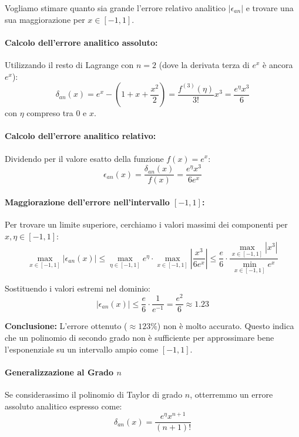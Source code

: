 \documentclass[a4paper,12pt]{article}
\begin{document}
	Vogliamo stimare quanto sia grande l'errore relativo analitico $|\epsilon_{an}|$ e trovare una sua maggiorazione per $x \in [-1, 1]$.
	
	\paragraph{Calcolo dell'errore analitico assoluto:}
	Utilizzando il resto di Lagrange con $n=2$ (dove la derivata terza di $e^x$ è ancora $e^x$):
	\[ \delta_{an}(x) = e^x - \left( 1 + x + \frac{x^2}{2} \right) = \frac{f^{(3)}(\eta)}{3!} x^3 = \frac{e^\eta x^3}{6} \]
	con $\eta$ compreso tra $0$ e $x$.
	
	\paragraph{Calcolo dell'errore analitico relativo:}
	Dividendo per il valore esatto della funzione $f(x) = e^x$:
	\[ \epsilon_{an}(x) = \frac{\delta_{an}(x)}{f(x)} = \frac{e^\eta x^3}{6 e^x} \]
	
	\paragraph{Maggiorazione dell'errore nell'intervallo $[-1, 1]$:}
	Per trovare un limite superiore, cerchiamo i valori massimi dei componenti per $x, \eta \in [-1, 1]$:
	\[ 
	\max_{x \in [-1, 1]} |\epsilon_{an}(x)| \leqslant \max_{\eta \in [-1, 1]} e^\eta \cdot \max_{x \in [-1, 1]} \left| \frac{x^3}{6 e^x} \right| \leqslant \frac{e}{6} \cdot \frac{\max_{x \in [-1, 1]} |x^3|}{\min_{x \in [-1, 1]} e^x} 
	\]
	
	Sostituendo i valori estremi nel dominio:
	\[ 
	|\epsilon_{an}(x)| \leqslant \frac{e}{6} \cdot \frac{1}{e^{-1}} = \frac{e^2}{6} \approx 1.23 
	\]
	
	\begin{tcolorbox}[colback=orange!5!white, colframe=orange!75!black]
		\textbf{Conclusione:} L'errore ottenuto ($\approx 123\%$) non è molto accurato. Questo indica che un polinomio di secondo grado non è sufficiente per approssimare bene l'esponenziale su un intervallo ampio come $[-1, 1]$.
	\end{tcolorbox}
	
	\paragraph{Generalizzazione al Grado $n$}
	
	Se considerassimo il polinomio di Taylor di grado $n$, otterremmo un errore assoluto analitico espresso come:
	\begin{equation}
		\delta_{an}(x) = \frac{e^{\eta} x^{n+1}}{(n+1)!}
	\end{equation}
	
\end{document}
